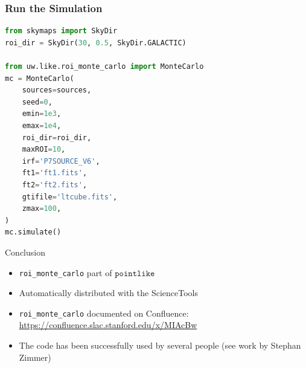 \documentclass[12pt]{beamer}
\newcommand{\pointlike}{\ensuremath{\mathtt{pointlike}}\xspace}
\newcommand{\roimc}{\texttt{roi\_monte\_carlo}\xspace}
\begin{document}
\begin{frame}[fragile]
\frametitle{Run the Simulation}

\begin{lstlisting}[language=Python]
from skymaps import SkyDir
roi_dir = SkyDir(30, 0.5, SkyDir.GALACTIC)

from uw.like.roi_monte_carlo import MonteCarlo
mc = MonteCarlo(
    sources=sources,
    seed=0,
    emin=1e3,
    emax=1e4,
    roi_dir=roi_dir,
    maxROI=10,
    irf='P7SOURCE_V6',
    ft1='ft1.fits',
    ft2='ft2.fits',
    gtifile='ltcube.fits',
    zmax=100,
)
mc.simulate()
\end{lstlisting}


\end{frame}

\begin{frame}{Conclusion}
  \begin{itemize}
    \item \roimc part of \pointlike
    \item Automatically distributed with the ScienceTools
    \item \roimc documented on Confluence:
      \url{https://confluence.slac.stanford.edu/x/MIAcBw}
    \item The code has been successfully used by several people (see work by Stephan Zimmer)
  \end{itemize}
\end{frame}
\end{document}

